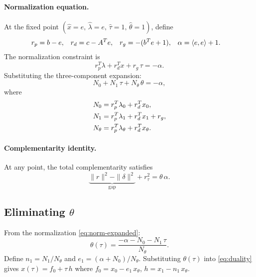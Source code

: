 \documentclass{article}
\newcommand{\ip}[2]{\langle #1, #2 \rangle}
\begin{document}
\paragraph{Normalization equation.}
At the fixed point $(\hat x = e,\, \hat\lambda = e,\,
\hat\tau = 1,\, \hat\theta = 1)$, define
\begin{align}
  r_p &= b - e, &
  r_d &= c - A^T e, &
  r_g &= -(b^T e + 1), &
  \alpha &= \ip{e}{e} + 1. \notag
\end{align}
The normalization constraint is
\begin{equation}\label{eq:norm}
  r_p^T \lambda + r_d^T x + r_g\,\tau = -\alpha.
\end{equation}
Substituting the three-component expansion:
\begin{equation}\label{eq:norm-expanded}
  N_0 + N_1\,\tau + N_\theta\,\theta = -\alpha,
\end{equation}
where
\begin{align}
  N_0 &= r_p^T \lambda_0 + r_d^T x_0, \notag\\
  N_1 &= r_p^T \lambda_1 + r_d^T x_1 + r_g, \notag\\
  N_\theta &= r_p^T \lambda_\theta + r_d^T x_\theta. \notag
\end{align}

\paragraph{Complementarity identity.}
At any point, the total complementarity satisfies
\begin{equation}\label{eq:compl-id}
  \underbrace{\|r\|^2 - \|\delta\|^2}_{\text{gap}}
  + r_\tau^2 = \theta\,\alpha.
\end{equation}

\subsection{Eliminating $\theta$}

From the normalization \eqref{eq:norm-expanded}:
\begin{equation}\label{eq:theta-from-norm}
  \theta(\tau) = \frac{-\alpha - N_0 - N_1\,\tau}{N_\theta}.
\end{equation}
Define $n_1 = N_1/N_\theta$ and $e_1 = (\alpha + N_0)/N_\theta$.
Substituting $\theta(\tau)$ into \eqref{eq:duality} gives
$x(\tau) = f_0 + \tau\,h$ where $f_0 = x_0 - e_1\,x_\theta$,
$h = x_1 - n_1\,x_\theta$.
\end{document}
